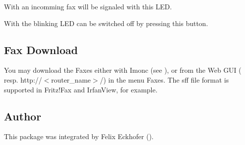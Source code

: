 \begin{description}

    With  an incomming fax will be signaled with 
    this LED.
    
    With  the blinking LED can be switched off 
    by pressing this button.

\end{description}

\subsection {Fax Download}

    You may download the Faxes either with Imonc (see ),
    or from the Web GUI ( resp. 
    http://$<$router\_name$>$/) in the menu Faxes.
    The sff file format is supported in Fritz!Fax and IrfanView, for example.


\subsection {Author}

    This package was integrated by Felix Eckhofer ().
